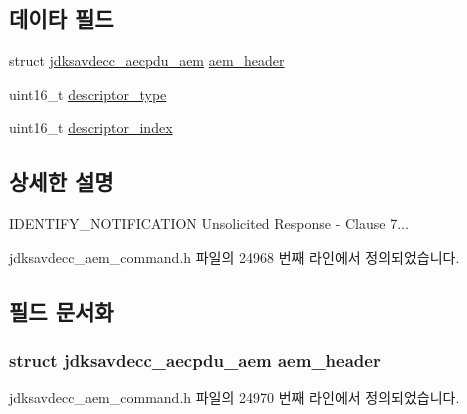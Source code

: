 \subsection*{데이타 필드}
\begin{DoxyCompactItemize}
\item 
struct \hyperlink{structjdksavdecc__aecpdu__aem}{jdksavdecc\+\_\+aecpdu\+\_\+aem} \hyperlink{structjdksavdecc__aem__command__identify__notification_ae1e77ccb75ff5021ad923221eab38294}{aem\+\_\+header}
\item 
uint16\+\_\+t \hyperlink{structjdksavdecc__aem__command__identify__notification_ab7c32b6c7131c13d4ea3b7ee2f09b78d}{descriptor\+\_\+type}
\item 
uint16\+\_\+t \hyperlink{structjdksavdecc__aem__command__identify__notification_a042bbc76d835b82d27c1932431ee38d4}{descriptor\+\_\+index}
\end{DoxyCompactItemize}


\subsection{상세한 설명}
I\+D\+E\+N\+T\+I\+F\+Y\+\_\+\+N\+O\+T\+I\+F\+I\+C\+A\+T\+I\+ON Unsolicited Response -\/ Clause 7... 

jdksavdecc\+\_\+aem\+\_\+command.\+h 파일의 24968 번째 라인에서 정의되었습니다.



\subsection{필드 문서화}
\subsubsection[{\texorpdfstring{aem\+\_\+header}{aem_header}}]{\setlength{\rightskip}{0pt plus 5cm}struct {\bf jdksavdecc\+\_\+aecpdu\+\_\+aem} aem\+\_\+header}\hypertarget{structjdksavdecc__aem__command__identify__notification_ae1e77ccb75ff5021ad923221eab38294}{}\label{structjdksavdecc__aem__command__identify__notification_ae1e77ccb75ff5021ad923221eab38294}


jdksavdecc\+\_\+aem\+\_\+command.\+h 파일의 24970 번째 라인에서 정의되었습니다.

